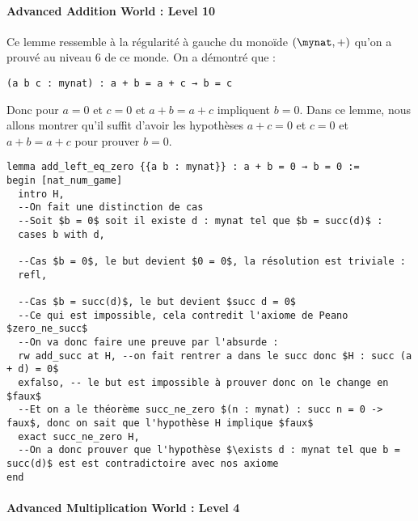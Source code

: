 \paragraph{Advanced Addition World : Level 10}

Ce lemme ressemble à la régularité à gauche du monoïde $(\mynat, +)$ qu'on a prouvé au niveau 6 de ce monde.
On a démontré que :
\begin{verbatim}
(a b c : mynat) : a + b = a + c → b = c
\end{verbatim}
Donc pour $a = 0$ et $c = 0$ et $a + b = a + c$ impliquent $b = 0$.
Dans ce lemme, nous allons montrer qu'il suffit d'avoir les hypothèses $a+c = 0$ et $c = 0$ et $a + b = a + c$ pour prouver $b = 0$.

\begin{verbatim}
lemma add_left_eq_zero {{a b : mynat}} : a + b = 0 → b = 0 :=
begin [nat_num_game]
  intro H,
  --On fait une distinction de cas
  --Soit $b = 0$ soit il existe d : mynat tel que $b = succ(d)$ :
  cases b with d,

  --Cas $b = 0$, le but devient $0 = 0$, la résolution est triviale :
  refl,

  --Cas $b = succ(d)$, le but devient $succ d = 0$
  --Ce qui est impossible, cela contredit l'axiome de Peano $zero_ne_succ$
  --On va donc faire une preuve par l'absurde :
  rw add_succ at H, --on fait rentrer a dans le succ donc $H : succ (a + d) = 0$
  exfalso, -- le but est impossible à prouver donc on le change en $faux$
  --Et on a le théorème succ_ne_zero $(n : mynat) : succ n = 0 -> faux$, donc on sait que l'hypothèse H implique $faux$
  exact succ_ne_zero H,
  --On a donc prouver que l'hypothèse $\exists d : mynat tel que b = succ(d)$ est est contradictoire avec nos axiome
end
\end{verbatim}

\paragraph{Advanced Multiplication World : Level 4}

